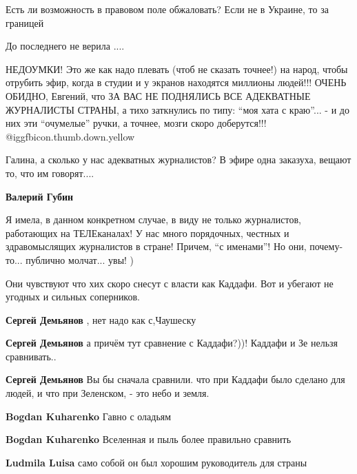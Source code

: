 \begin{itemize}
\begin{itemize}
Есть ли возможность в правовом поле обжаловать?
Если не в Украине, то за границей
\end{itemize} %

До последнего не верила ....


НЕДОУМКИ! Это же как надо плевать (чтоб не сказать точнее!) на народ, чтобы
отрубить эфир, когда в студии и у экранов находятся миллионы людей!!! ОЧЕНЬ
ОБИДНО, Евгений, что ЗА ВАС НЕ ПОДНЯЛИСЬ ВСЕ АДЕКВАТНЫЕ ЖУРНАЛИСТЫ СТРАНЫ, а
тихо заткнулись по типу: \enquote{моя хата с краю}... - и до них эти \enquote{очумелые} ручки,
а точнее, мозги скоро доберутся!!!  @igg{fbicon.thumb.down.yellow} 

\begin{itemize} %

Галина, а сколько у нас адекватных журналистов? В эфире одна заказуха, вещают
то, что им говорят....

\textbf{Валерий Губин} 

Я имела, в данном конкретном случае, в виду не только журналистов, работающих
на ТЕЛЕканалах! У нас много порядочных, честных и здравомыслящих журналистов в
стране! Причем, \enquote{с именами}! Но они, почему-то... публично молчат... увы! )

\end{itemize} %


Они чувствуют что хих скоро снесут с власти как Каддафи. Вот и убегают не
угодных и сильных соперников.

\begin{itemize} %
\textbf{Сергей Демьянов} , нет надо как с,Чаушеску

\textbf{Сергей Демьянов} а причём тут сравнение с Каддафи?))! Каддафи и Зе нельзя сравнивать..

\textbf{Сергей Демьянов} Вы бы сначала сравнили. что при Каддафи было сделано для людей, и что при Зеленском, - это небо и земля.

\textbf{Bogdan Kuharenko} Гавно с оладьям

\textbf{Bogdan Kuharenko} Вселенная и пыль более правильно сравнить

\textbf{Ludmila Luisa} само собой он был хорошим руководитель для страны


\end{itemize}
\end{itemize}
